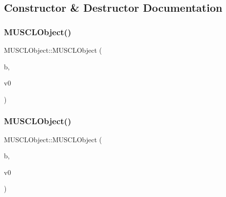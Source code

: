 \subsection{Constructor \& Destructor Documentation}
\mbox{\label{structMUSCLObject_a481dc01556085bc96bea8a87c9ffb80f}} 
\subsubsection{\texorpdfstring{M\+U\+S\+C\+L\+Object()}{MUSCLObject()}\hspace{0.1cm}{\footnotesize\ttfamily [1/2]}}
{\footnotesize\ttfamily M\+U\+S\+C\+L\+Object\+::\+M\+U\+S\+C\+L\+Object (\begin{DoxyParamCaption}\item[{\hyperlink{structBathymetry}{Bathymetry} \&\&}]{b,  }\item[{const \hyperlink{ValueField_8h_a329043a10c46a8722ea79ba24fe40f97}{Volume\+Field} \&}]{v0 }\end{DoxyParamCaption})\hspace{0.3cm}{\ttfamily [protected]}}

\mbox{\label{structMUSCLObject_a66671ff223b2d645758754ba4122801b}} 
\subsubsection{\texorpdfstring{M\+U\+S\+C\+L\+Object()}{MUSCLObject()}\hspace{0.1cm}{\footnotesize\ttfamily [2/2]}}
{\footnotesize\ttfamily M\+U\+S\+C\+L\+Object\+::\+M\+U\+S\+C\+L\+Object (\begin{DoxyParamCaption}\item[{\hyperlink{structBathymetry}{Bathymetry} \&\&}]{b,  }\item[{\hyperlink{ValueField_8h_a329043a10c46a8722ea79ba24fe40f97}{Volume\+Field} \&\&}]{v0 }\end{DoxyParamCaption})\hspace{0.3cm}{\ttfamily [protected]}}



